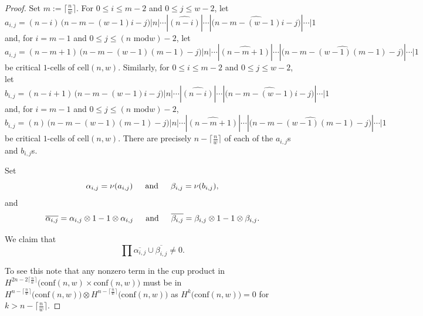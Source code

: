 \documentclass[10pt,a4paper]{amsart}
\begin{document}
\begin{proof}
Set $m:=\big\lceil\frac{n}{w}\big\rceil$.
For $0\le i\le m-2$ and $0\le j\le w-2$, let
\[
a_{i, j}=(n-i)\, \big(n-m-(w-1)i-j\big)|n|\cdots|\widehat{(n-i)}|\cdots|\widehat{\big(n-m-(w-1)i-j\big)}|\cdots|1
\]
and, for $i=m-1$ and $0\le j\le (n\text{ mod}w)-2$, let
\[
a_{i,j}=(n-m+1)\, \big(n-m-(w-1)(m-1)-j\big)|n|\cdots|\widehat{(n-m+1)}|\cdots|\widehat{\big(n-m-(w-1)(m-1)-j\big)}|\cdots|1
\]
be critical $1$-cells of $\text{cell}(n,w)$.
Similarly, for $0\le i\le m-2$ and $0\le j\le w-2$, let
\[
b_{i, j}=(n-i+1)\, \big(n-m-(w-1)i-j\big)|n|\cdots|\widehat{(n-i)}|\cdots|\widehat{\big(n-m-(w-1)i-j\big)}|\cdots|1
\]
and, for $i=m-1$ and $0\le j\le (n\text{ mod}w)-2$,
\[
b_{i,j}=(n)\, \big(n-m-(w-1)(m-1)-j\big)|n|\cdots|\widehat{(n-m+1)}|\cdots|\widehat{\big(n-m-(w-1)(m-1)-j\big)}|\cdots|1
\]
be critical $1$-cells of $\text{cell}(n,w)$.
There are precisely $n-\big\lceil\frac{n}{w}\big\rceil$ of each of the $a_{i, j}$s and $b_{i,j}$s.

Set
\[
\alpha_{i,j}=\nu(a_{i,j})\indent\text{and}\indent\beta_{i,j}=\nu(b_{i,j}),
\]
and
\[
\overline{\alpha_{i,j}}=\alpha_{i,j}\otimes 1-1\otimes \alpha_{i,j}\indent\text{and}\indent
\overline{\beta_{i,j}}=\beta_{i,j}\otimes 1-1\otimes \beta_{i,j}.
\]

We claim that 
\[
\prod\overline{\alpha_{i,j}}\cup\overline{\beta_{i,j}}\neq0.
\]

To see this note that any nonzero term in the cup product in $H^{2n-2\big\lceil\frac{n}{w}\big\rceil}\big(\text{conf}(n,w)\times \text{conf}(n,w)\big)$ must be in $H^{n-\lceil\frac{n}{w}\rceil}\big(\text{conf}(n,w)\big)\otimes H^{n-\lceil\frac{n}{w}\rceil}\big(\text{conf}(n,w)\big)$ as $H^{k}\big(\text{conf}(n,w)\big)=0$ for $k>n-\big\lceil\frac{n}{w}\big\rceil$.


\end{proof}
\end{document}
